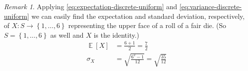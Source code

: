 \documentclass[11pt,letterpaper]{article}
\theoremstyle{definition}
\theoremstyle{remark}
\newtheorem{rem}{Remark}[section]
\newcommand{\setof}[1]{\left\{#1\right\}}
\newcommand{\range}[2][1]{%
    \setof{#1,\ldots,#2}
}
\DeclareMathOperator{\Expect}{\mathbb{E}}
\newcommand{\E}[1]{\Expect{\left[#1\right]}}
\begin{document}
\begin{rem}
    Applying \eqref{eq:expectation-discrete-uniform} and
    \eqref{eq:variance-discrete-uniform} we can easily find the expectation and
    standard deviation, respectively, of $X : S \to \range{6}$ representing the
    upper face of a roll of a fair die.
    (So $S = \range{6}$ as well and $X$ is the identity.)
    \begin{align*}
        \E{X}
        &= \frac{6 + 1}{2} = \frac{7}{2} \\
        \sigma_X
        &= \sqrt{
            \frac{6^2 - 1}{12}
        }
        = \sqrt{ \frac{35}{12} }
    \end{align*}
\end{rem}
\end{document}
